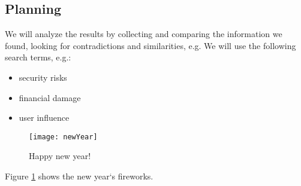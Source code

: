 \documentclass[]{report}
\begin{document}
\subsection{Planning}
We will analyze the results by collecting and comparing the information we found, looking for contradictions and similarities, e.g. We will use the following search terms, e.g.:
\begin{itemize}
	\item security risks
	\item financial damage
	\item user influence
\end{itemize}

\begin{figure}[h]%
	\texttt{[image: newYear]}
	
	\caption{Happy new year!
		}
	\label{fig:newYear}
	
\end{figure}

\begin{flushleft}
	Figure \ref{fig:newYear} shows the new year`s fireworks.
\end{flushleft} 

\printbibliography
\end{document}
